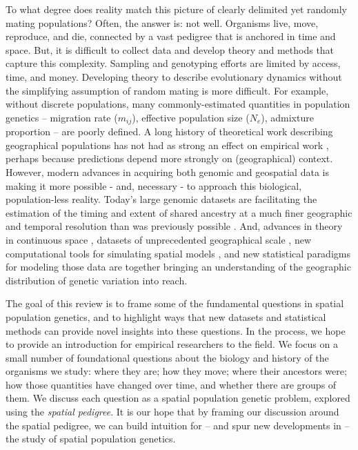 \documentclass{ar-1col}
\renewcommand{\emph}[1]{{\textit{#1}}}
\begin{document}
To what degree does reality match this picture
of clearly delimited yet randomly mating populations?
Often, the answer is: not well.
Organisms live, move, reproduce, and die,
connected by a vast pedigree that is anchored in time and space.
But, it is difficult to collect data and develop theory and methods
that capture this complexity.
Sampling and genotyping efforts are limited by access, time, and money.
Developing theory to describe evolutionary dynamics
without the simplifying assumption of random mating
is more difficult.
For example, without discrete populations,
many commonly-estimated quantities in population genetics -- 
migration rate ($m_{ij}$), 
effective population size ($N_e$),
admixture proportion
--
are poorly defined.
A long history of theoretical work describing geographical populations
\citep[e.g.,][]{fisher1937wave,haldane1948theory,slatkin1973geneflow,nagylaki1975conditions,sawyer1976branching,barton1979dynamics}
has not had as strong an effect on empirical work \citep[but see][]{landscape_genomics_review},
perhaps because predictions depend more strongly on (geographical) context.
However, modern advances in acquiring both genomic and geospatial data
is making it more possible - and, necessary - to approach this biological, population-less reality.
Today's large genomic datasets
are facilitating the estimation of the timing and extent of shared ancestry 
at a much finer geographic and temporal resolution than was previously possible
\citep{Li_Durbin2011,Palamara_2012,Harris_Nielsen_2013,ralph2013geography}.
And, advances in theory in continuous space 
\citep{felsenstein1975pain,BartonWilson1995,barton-depaulis-etheridge, barton2010modelling, barton2010newmodel, hallatschek2011noisy, Barton2013},
datasets of unprecedented geographical scale
\citep[e.g.,][]{POBI, Aguillon2017deconstructing, Shaffer195743},
new computational tools for simulating spatial models \citep{haller2018forward,haller2018treesequence},
and new statistical paradigms for modeling those data 
\citep{petkova2016visualizing, ringbauer2017inferring, ringbauer2018estimating, conStruct, alasadi2018estimating}
are together bringing an understanding of the geographic distribution of genetic variation into reach.

The goal of this review
is to frame some of the fundamental questions in spatial population genetics,
and to highlight ways that new datasets and statistical methods 
can provide novel insights into these questions.
In the process, 
we hope to provide an introduction for empirical researchers
to the field.
We focus on a small number of foundational questions 
about the biology and history of the organisms we study:
where they are; how they move; where their ancestors were;
how those quantities have changed over time, 
and whether there are groups of them.
We discuss each question
as a spatial population genetic problem, 
explored using the \emph{spatial pedigree}.
It is our hope that by framing our discussion around the spatial pedigree, 
we can build intuition for --
and spur new developments in --
the study of spatial population genetics.
\end{document}
